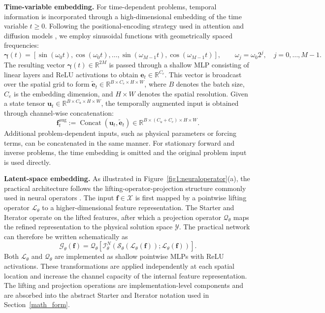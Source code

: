 \documentclass[preprint,numbers,sort&compress]{elsarticle}
\begin{document}
		\textbf{Time-variable embedding.}
		For time-dependent problems, temporal information is incorporated through a high-dimensional embedding of the time variable $t\geq0$. Following the positional-encoding strategy used in attention and diffusion models
		\cite{vaswani2017attention,ho2020denoising}, we employ sinusoidal functions with geometrically spaced frequencies:
		\[
		\boldsymbol\gamma(t)
		=
		\left[
		\sin(\omega_0t),\cos(\omega_0t),
		\ldots,
		\sin(\omega_{M-1}t),\cos(\omega_{M-1}t)
		\right],
		\qquad
		\omega_j=\omega_0 2^j,
		\quad j=0,\ldots,M-1.
		\]
		The resulting vector $\boldsymbol\gamma(t)\in\mathbb R^{2M}$ is passed through a shallow MLP consisting of linear layers and ReLU activations to obtain
		$\boldsymbol e_t\in\mathbb R^{C_e}$. This vector is broadcast over the spatial grid to form $\widetilde{\boldsymbol e}_t
		\in \mathbb R^{B\times C_e\times H\times W}$, where $B$ denotes the batch size, $C_e$ is the embedding dimension, and $H\times W$ denotes the spatial resolution. Given a state tensor $\boldsymbol u_t \in \mathbb R^{B\times C_u\times H\times W}$, the temporally augmented input is obtained through channel-wise concatenation:
		\[
		\boldsymbol f_t^{\mathrm{aug}}
		:=
		\operatorname{Concat}
		\left(
		\boldsymbol u_t,
		\widetilde{\boldsymbol e}_t
		\right)
		\in
		\mathbb R^{B\times(C_u+C_e)\times H\times W}.
		\]
		Additional problem-dependent inputs, such as physical parameters or forcing terms, can be concatenated in the same manner. For stationary forward and inverse problems, the time embedding is omitted and the original problem
		input is used directly.
		
		\textbf{Latent-space embedding.} As illustrated in Figure~\ref{fig1:neuraloperator}(a), the practical
		architecture follows the lifting-operator-projection structure commonly used in neural operators \cite{kovachki2023neural}. The input $\boldsymbol f\in\mathcal X$ is first mapped by a pointwise lifting operator $\mathcal L_\theta$ to a higher-dimensional feature representation. The Starter and Iterator operate on the lifted features, after which a projection operator $\mathcal Q_\theta$ maps the refined representation to the physical solution space $\mathcal Y$. The practical network can therefore be written schematically as
		\[
		\mathcal G_\theta(\boldsymbol f)
		=
		\mathcal Q_\theta
		\left[
		\mathcal I_\theta^N
		\left(
		\mathcal S_\theta
		\left(
		\mathcal L_\theta(\boldsymbol f)
		\right);
		\mathcal L_\theta(\boldsymbol f)
		\right)
		\right].
		\]
		Both $\mathcal L_\theta$ and $\mathcal Q_\theta$ are implemented as shallow pointwise MLPs with ReLU activations. These transformations are applied
		independently at each spatial location and increase the channel capacity of the internal feature representation. The lifting and projection operations are implementation-level components and are absorbed into the abstract
		Starter and Iterator notation used in Section~\ref{math_form}.
		
\end{document}
